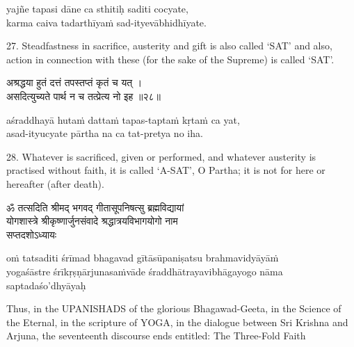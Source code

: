 \begin{transliteration}
yajñe tapasi dāne ca sthitiḥ saditi cocyate, \\
karma caiva tadarthīyaṁ sad-ityevābhidhīyate.
\end{transliteration}

27. Steadfastness in sacrifice, austerity and gift is also called `SAT' and
also, action in connection with these (for the sake of the Supreme) is called
`SAT'.

\begin{gitaverse}
अश्रद्धया हुतं दत्तं तपस्तप्तं कृतं च यत् । \\
असदित्युच्यते पार्थ न च तत्प्रेत्य नो इह ॥२८॥
\end{gitaverse}

\begin{transliteration}
aśraddhayā hutaṁ dattaṁ tapas-taptaṁ kṛtaṁ ca yat, \\
asad-ityucyate pārtha na ca tat-pretya no iha.
\end{transliteration}

28. Whatever is sacrificed, given or performed, and whatever austerity is
practised without faith, it is called `A-SAT', O Partha; it is not for here or
hereafter (after death).

\begin{gitaverse}
ॐ तत्सदिति श्रीमद् भगवद् गीतासूपनिषत्सु ब्रह्मविद्यायां \\
योगशास्त्रे श्रीकृष्णार्जुनसंवादे श्रद्धात्रयविभागयोगो नाम \\
सप्तदशोऽध्यायः
\end{gitaverse}

\begin{transliteration}
oṁ tatsaditi śrīmad bhagavad gītāsūpaniṣatsu brahmavidyāyāṁ \\
yogaśāstre śrīkṛṣṇārjunasaṁvāde śraddhātrayavibhāgayogo nāma \\
saptadaśo'dhyāyaḥ
\end{transliteration}

Thus, in the UPANISHADS of the glorious Bhagawad-Geeta, in the Science of the
Eternal, in the scripture of YOGA, in the dialogue between Sri Krishna and
Arjuna, the seventeenth discourse ends entitled: The Three-Fold Faith
